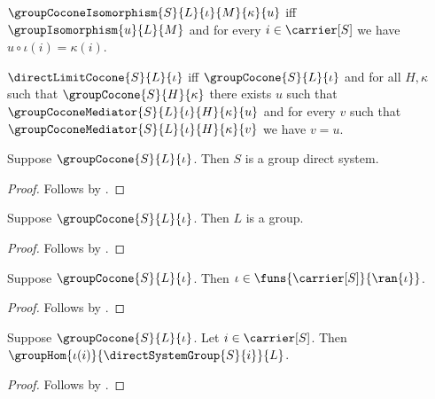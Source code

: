 \begin{definition}\label{group_cocone_isomorphism}
    $\groupCoconeIsomorphism{S}{L}{\iota}{M}{\kappa}{u}$ iff
        $\groupIsomorphism{u}{L}{M}$ and
        for every $i\in\carrier[S]$ we have
            $u\circ\iota(i)=\kappa(i)$.
\end{definition}

\begin{definition}\label{group_direct_limit_cocone}
    $\directLimitCocone{S}{L}{\iota}$ iff
        $\groupCocone{S}{L}{\iota}$ and
        for all $H,\kappa$ such that $\groupCocone{S}{H}{\kappa}$
        there exists $u$ such that
            $\groupCoconeMediator{S}{L}{\iota}{H}{\kappa}{u}$ and
            for every $v$ such that
                $\groupCoconeMediator{S}{L}{\iota}{H}{\kappa}{v}$
            we have $v=u$.
\end{definition}

\begin{proposition}\label{group_cocone_system}
    Suppose $\groupCocone{S}{L}{\iota}$.
    Then $S$ is a group direct system.
\end{proposition}
\begin{proof}
    Follows by .
\end{proof}

\begin{proposition}\label{group_cocone_target}
    Suppose $\groupCocone{S}{L}{\iota}$.
    Then $L$ is a group.
\end{proposition}
\begin{proof}
    Follows by .
\end{proof}

\begin{proposition}\label{group_cocone_family_type}
    Suppose $\groupCocone{S}{L}{\iota}$.
    Then $\iota\in\funs{\carrier[S]}{\ran{\iota}}$.
\end{proposition}
\begin{proof}
    Follows by .
\end{proof}

\begin{proposition}\label{group_cocone_leg_hom}
    Suppose $\groupCocone{S}{L}{\iota}$.
    Let $i\in\carrier[S]$.
    Then $\groupHom{\iota(i)}{\directSystemGroup{S}{i}}{L}$.
\end{proposition}
\begin{proof}
    Follows by .
\end{proof}

